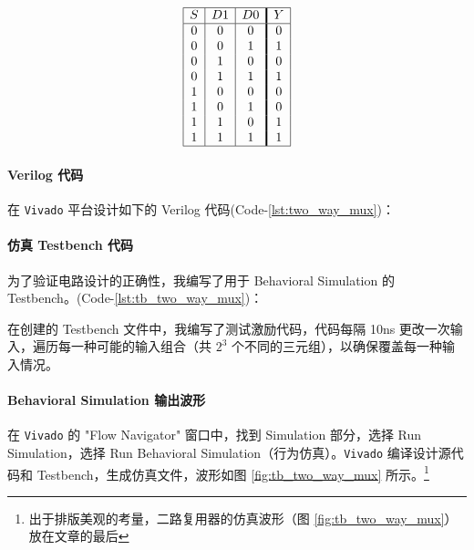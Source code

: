 \documentclass[10pt,a4paper,twoside]{rho-class/rho}
\begin{document}
            \[
            \begin{array}{|c|c|c!{\vrule width 1.4pt}c|}
            \hline
            S & D1 & D0 & Y \\
            \hline
            0 & 0 & 0 & 0 \\
            0 & 0 & 1 & 1 \\
            0 & 1 & 0 & 0 \\
            0 & 1 & 1 & 1 \\
            1 & 0 & 0 & 0 \\
            1 & 0 & 1 & 0 \\
            1 & 1 & 0 & 1 \\
            1 & 1 & 1 & 1 \\
            \hline
            \end{array}
            \]

        
        \paragraph{Verilog 代码}
        
            在 \verb|Vivado| 平台设计如下的 Verilog 代码(Code-\ref{lst:two_way_mux})：
                

        
        \paragraph{仿真 Testbench 代码}
        
            为了验证电路设计的正确性，我编写了用于 Behavioral Simulation 的 Testbench。(Code-\ref{lst:tb_two_way_mux})：
                
        
        在创建的 Testbench 文件中，我编写了测试激励代码，代码每隔 10ns 更改一次输入，遍历每一种可能的输入组合（共 $2^3$ 个不同的三元组），以确保覆盖每一种输入情况。
        
        \paragraph{Behavioral Simulation 输出波形}
        
        在 \verb|Vivado| 的 "Flow Navigator" 窗口中，找到 Simulation 部分，选择 Run Simulation，选择 Run Behavioral Simulation（行为仿真）。\verb|Vivado| 编译设计源代码和 Testbench，生成仿真文件，波形如图 \ref{fig:tb_two_way_mux} 所示。\footnote{出于排版美观的考量，二路复用器的仿真波形（图 \ref{fig:tb_two_way_mux}）放在文章的最后}
        
\end{document}
